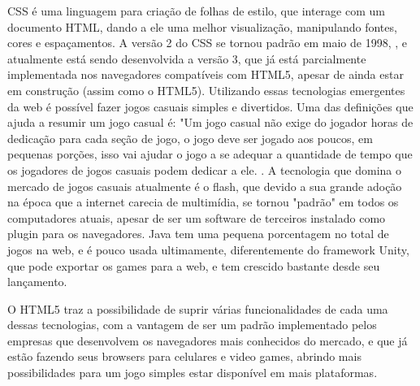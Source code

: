 CSS é uma linguagem para criação de folhas de estilo, que interage com um documento
HTML, dando a ele uma melhor visualização, manipulando fontes, cores e espaçamentos.
A versão 2 do CSS se tornou padrão em maio de 1998, \cite{zeldman2009designing},
e atualmente está sendo desenvolvida a versão 3, que já está parcialmente implementada
nos navegadores compatíveis com HTML5, apesar de ainda estar em construção (assim como o HTML5).
Utilizando essas tecnologias emergentes da web é possível fazer jogos casuais simples
e divertidos. Uma das definições que ajuda a resumir um jogo casual é: "Um jogo casual não exige do jogador horas de
dedicação para cada seção de jogo, o jogo deve ser jogado aos poucos, em pequenas
porções, isso vai ajudar o jogo a se adequar a quantidade de tempo que os jogadores
de jogos casuais podem dedicar a ele. \cite{trefry2010casual}.
A tecnologia que domina o mercado de jogos casuais atualmente é o flash, que devido
a sua grande adoção na época que a internet carecia de multimídia, se tornou "padrão"
em todos os computadores atuais, apesar de ser um software de terceiros instalado
como plugin para os navegadores. Java tem uma pequena porcentagem no total de jogos
na web, e é pouco usada ultimamente, diferentemente do framework Unity, que pode exportar
os games para a web, e tem crescido bastante desde seu lançamento.

O HTML5 traz a possibilidade de suprir várias funcionalidades de cada uma dessas tecnologias,
com a vantagem de ser um padrão implementado pelos empresas que desenvolvem os navegadores
mais conhecidos do mercado, e que já estão fazendo seus browsers para celulares e
video games, abrindo mais possibilidades para um jogo simples estar disponível em mais plataformas.
